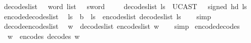 \begin{isabellebody}
\isanewline
{}\isamarkupfalse%
\ decode{\isacharunderscore}{\kern0pt}s{}{\isacharunderscore}{\kern0pt}list\ {\isacharcolon}{\kern0pt}{\isacharcolon}{\kern0pt}\ {\isachardoublequoteopen}{}\ word\ list\ {\isasymRightarrow}\ {}\ sword{\isachardoublequoteclose}\isanewline
\ \ \isanewline
\ \ {\isachardoublequoteopen}decode{\isacharunderscore}{\kern0pt}s{}{\isacharunderscore}{\kern0pt}list\ ls\ {\isasymequiv}\ UCAST{\isacharparenleft}{\kern0pt}{}\ {\isasymrightarrow}\ {}\ signed{\isacharparenright}{\kern0pt}\ {\isacharparenleft}{\kern0pt}hd\ ls{\isacharparenright}{\kern0pt}{\isachardoublequoteclose}\isanewline
\isanewline
{}\isamarkupfalse%
\ encode{\isacharunderscore}{\kern0pt}decode{\isacharunderscore}{\kern0pt}s{}{\isacharunderscore}{\kern0pt}list{\isacharcolon}{\kern0pt}\isanewline
\ \ {\isachardoublequoteopen}ls\ {\isacharequal}{\kern0pt}\ {\isacharbrackleft}{\kern0pt}b{\isacharbrackright}{\kern0pt}\ {\isasymLongrightarrow}\ ls\ {\isacharequal}{\kern0pt}\ encode{\isacharunderscore}{\kern0pt}s{}{\isacharunderscore}{\kern0pt}list\ {\isacharparenleft}{\kern0pt}decode{\isacharunderscore}{\kern0pt}s{}{\isacharunderscore}{\kern0pt}list\ ls{\isacharparenright}{\kern0pt}{\isachardoublequoteclose}\isanewline
%
\isadelimproof
\ \ %
\endisadelimproof
%
\isatagproof
{}\isamarkupfalse%
\ simp%
\endisatagproof
{\isafoldproof}%
%
\isadelimproof
\isanewline
%
\endisadelimproof
\isanewline
{}\isamarkupfalse%
\ decode{\isacharunderscore}{\kern0pt}encode{\isacharunderscore}{\kern0pt}s{}{\isacharunderscore}{\kern0pt}list{\isacharcolon}{\kern0pt}\isanewline
\ \ {\isachardoublequoteopen}w\ {\isacharequal}{\kern0pt}\ decode{\isacharunderscore}{\kern0pt}s{}{\isacharunderscore}{\kern0pt}list\ {\isacharparenleft}{\kern0pt}encode{\isacharunderscore}{\kern0pt}s{}{\isacharunderscore}{\kern0pt}list\ w{\isacharparenright}{\kern0pt}{\isachardoublequoteclose}\isanewline
%
\isadelimproof
\ \ %
\endisadelimproof
%
\isatagproof
{}\isamarkupfalse%
\ simp%
\endisatagproof
{\isafoldproof}%
%
\isadelimproof
\isanewline
%
\endisadelimproof
\isanewline
{}\isamarkupfalse%
\ encode{\isacharunderscore}{\kern0pt}decode{\isacharunderscore}{\kern0pt}s{}{\isacharcolon}{\kern0pt}\isanewline
\ \ {\isachardoublequoteopen}w\ {\isacharequal}{\kern0pt}\ encode{\isacharunderscore}{\kern0pt}s{}\ {\isacharparenleft}{\kern0pt}decode{\isacharunderscore}{\kern0pt}s{}\ w{\isacharparenright}{\kern0pt}{\isachardoublequoteclose}\isanewline

\end{isabellebody}
